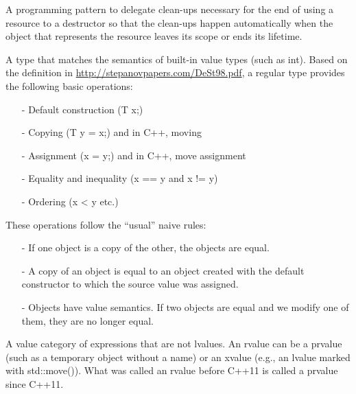 



A programming pattern to delegate clean-ups necessary for the end of using a resource to a destructor so that the clean-ups happen automatically when the object that represents the resource leaves its scope or ends its lifetime.



A type that matches the semantics of built-in value types (such as int). Based on the definition in \url{http://stepanovpapers.com/DeSt98.pdf}, a regular type provides the following basic operations:

\begin{itemize}
\item [-]
Default construction (T x;)

\item [-]
Copying (T y = x;) and in C++, moving

\item [-]
Assignment (x = y;) and in C++, move assignment

\item [-]
Equality and inequality (x == y and x != y)

\item [-]
Ordering (x < y etc.)
\end{itemize}

These operations follow the “usual” naive rules:

\begin{itemize}
\item [-]
If one object is a copy of the other, the objects are equal.

\item [-]
A copy of an object is equal to an object created with the default constructor to which the source value was assigned.

\item [-]
Objects have value semantics. If two objects are equal and we modify one of them, they are no longer equal.
\end{itemize}


A value category of expressions that are not lvalues. An rvalue can be a prvalue (such as a temporary object without a name) or an xvalue (e.g., an lvalue marked with std::move()). What was called an rvalue before C++11 is called a prvalue since C++11.


















